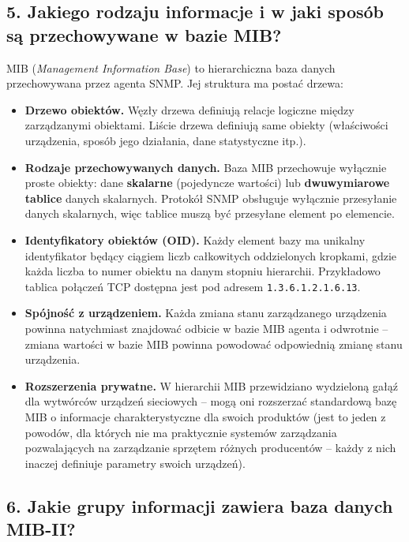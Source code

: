 \documentclass[12pt,a4paper]{article}
\begin{document}
\subsection*{5. Jakiego rodzaju informacje i w jaki sposób są przechowywane
w bazie MIB?}

MIB (\emph{Management Information Base}) to hierarchiczna baza danych
przechowywana przez agenta SNMP. Jej struktura ma postać drzewa:

\begin{itemize}
  \item \textbf{Drzewo obiektów.} Węzły drzewa definiują relacje logiczne
        między zarządzanymi obiektami. Liście drzewa definiują same obiekty
        (właściwości urządzenia, sposób jego działania, dane statystyczne itp.).
  \item \textbf{Rodzaje przechowywanych danych.} Baza MIB przechowuje wyłącznie
        proste obiekty: dane \textbf{skalarne} (pojedyncze wartości) lub
        \textbf{dwuwymiarowe tablice} danych skalarnych. Protokół SNMP obsługuje
        wyłącznie przesyłanie danych skalarnych, więc tablice muszą być
        przesyłane element po elemencie.
  \item \textbf{Identyfikatory obiektów (OID).} Każdy element bazy ma unikalny
        identyfikator będący ciągiem liczb całkowitych oddzielonych kropkami,
        gdzie każda liczba to numer obiektu na danym stopniu hierarchii. Przykładowo
        tablica połączeń TCP dostępna jest pod adresem \texttt{1.3.6.1.2.1.6.13}.
  \item \textbf{Spójność z urządzeniem.} Każda zmiana stanu zarządzanego
        urządzenia powinna natychmiast znajdować odbicie w bazie MIB agenta
        i odwrotnie -- zmiana wartości w bazie MIB powinna powodować odpowiednią
        zmianę stanu urządzenia.
  \item \textbf{Rozszerzenia prywatne.} W hierarchii MIB przewidziano wydzieloną
        gałąź dla wytwórców urządzeń sieciowych -- mogą oni rozszerzać standardową
        bazę MIB o informacje charakterystyczne dla swoich produktów (jest to
        jeden z powodów, dla których nie ma praktycznie systemów zarządzania
        pozwalających na zarządzanie sprzętem różnych producentów -- każdy z nich
        inaczej definiuje parametry swoich urządzeń).
\end{itemize}

\subsection*{6. Jakie grupy informacji zawiera baza danych MIB-II?}
\end{document}
